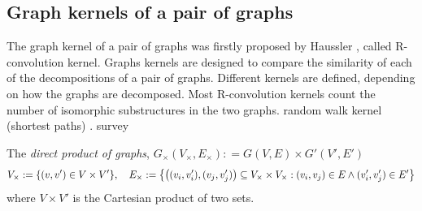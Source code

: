 \subsection{Graph kernels of a pair of graphs}
The graph kernel of a pair of graphs was firstly proposed by Haussler \cite{hausslerConvolutionKernelsDiscrete1999}, called R-convolution kernel.
Graphs kernels are designed to compare the similarity of each of the decompositions of a pair of graphs.
Different kernels are defined, depending on how the graphs are decomposed.
Most R-convolution kernels count the number of isomorphic substructures in the two graphs.
random walk kernel (shortest paths)
\cite{vishwanathanGraphKernels2010}. 
survey \cite{kriegeSurveyGraphKernels2020}
\begin{definition}\label{def:product_graphs}
	The \emph{direct product of graphs}, 
	$G_{\times}(V_{\times},E_{\times}) : =G(V,E)\times G'(V',E') $
	\begin{equation}
		V_{\times}:= \qty{(v,v')\in V\times V'}
		,\quad
		E_{\times}:= \qty{\qty((v_i,v_i'),(v_j,v_j'))\subseteq V_{\times}\times V_{\times}: (v_i,v_j)\in E \wedge (v_i',v_j')\in E'}
	\end{equation}
	where $V\times V'$ is the Cartesian product of two sets.



\end{definition}
